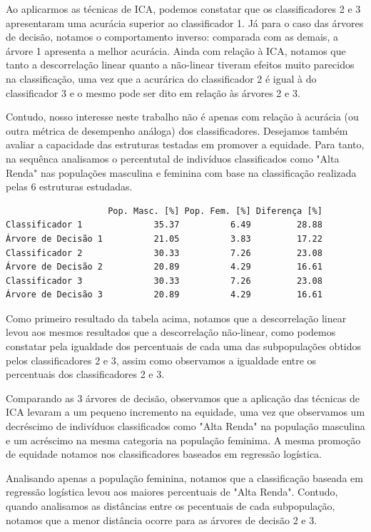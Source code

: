 \documentclass[11pt]{article}
\begin{document}
Ao aplicarmos as técnicas de ICA, podemos constatar que os
classificadores 2 e 3 apresentaram uma acurácia superior ao
classificador 1. Já para o caso das árvores de decisão, notamos o
comportamento inverso: comparada com as demais, a árvore 1 apresenta a
melhor acurácia. Ainda com relação à ICA, notamos que tanto a
descorrelação linear quanto a não-linear tiveram efeitos muito parecidos
na classificação, uma vez que a acurárica do classificador 2 é igual à
do classificador 3 e o mesmo pode ser dito em relação às árvores 2 e 3.

Contudo, nosso interesse neste trabalho não é apenas com relação à
acurácia (ou outra métrica de desempenho análoga) dos classificadores.
Desejamos também avaliar a capacidade das estruturas testadas em
promover a equidade. Para tanto, na sequênca analisamos o percentutal de
indivíduos classificados como "Alta Renda" nas populações masculina e
feminina com base na classificação realizada pelas 6 estruturas
estudadas.

    
    \begin{verbatim}
                    Pop. Masc. [%] Pop. Fem. [%] Diferença [%]
Classificador 1              35.37          6.49         28.88
Árvore de Decisão 1          21.05          3.83         17.22
Classificador 2              30.33          7.26         23.08
Árvore de Decisão 2          20.89          4.29         16.61
Classificador 3              30.33          7.26         23.08
Árvore de Decisão 3          20.89          4.29         16.61
    \end{verbatim}

    
    Como primeiro resultado da tabela acima, notamos que a descorrelação
linear levou aos mesmos resultados que a descorrelação não-linear, como
podemos constatar pela igualdade dos percentuais de cada uma das
subpopulações obtidos pelos classificadores 2 e 3, assim como observamos
a igualdade entre os percentuais dos classificadores 2 e 3.

Comparando as 3 árvores de decisão, observamos que a aplicação das
técnicas de ICA levaram a um pequeno incremento na equidade, uma vez que
observamos um decréscimo de indivíduos classificados como "Alta Renda"
na população masculina e um acréscimo na mesma categoria na população
feminima. A mesma promoção de equidade notamos nos classificadores
baseados em regressão logística.

Analisando apenas a população feminina, notamos que a classificação
baseada em regressão logística levou aos maiores percentuais de "Alta
Renda". Contudo, quando analisamos as distâncias entre os pecentuais de
cada subpopulação, notamos que a menor distância ocorre para as árvores
de decisão 2 e 3.
\end{document}
